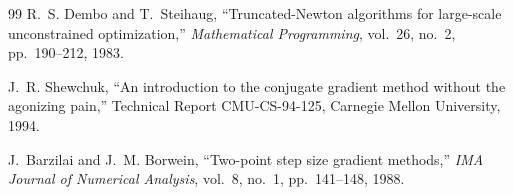 \documentclass[a4paper,12pt]{article}
\numberwithin{equation}{section}
\numberwithin{figure}{section}
\numberwithin{table}{section}
\begin{document}
\begin{thebibliography}{99}
R.~S. Dembo and T.~Steihaug,
``Truncated-Newton algorithms for large-scale unconstrained optimization,''
\textit{Mathematical Programming}, vol.~26, no.~2, pp.~190--212, 1983.

J.~R. Shewchuk,
``An introduction to the conjugate gradient method without the agonizing
pain,''
Technical Report CMU-CS-94-125, Carnegie Mellon University, 1994.

J.~Barzilai and J.~M. Borwein,
``Two-point step size gradient methods,''
\textit{IMA Journal of Numerical Analysis}, vol.~8, no.~1, pp.~141--148,
1988.

\end{thebibliography}
\end{document}
